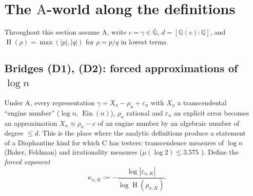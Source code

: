 \documentclass[11pt,a4paper]{article}
\newcommand{\Q}{\mathbb Q}
\newcommand{\Qbar}{\overline{\mathbb Q}}
\newcommand{\Ein}{\operatorname{Ein}}
\DeclareMathOperator{\Ht}{H}
\theoremstyle{definition}
\theoremstyle{remark}
\numberwithin{equation}{section}
\begin{document}
\section{The $\mathrm A$-world along the definitions}\label{III:sec:Aworld}

Throughout this section assume $\mathrm A$, write $c=\gamma\in\Qbar$, $d=[\Q(c):\Q]$,
and $\Ht(\rho)=\max(|p|,|q|)$ for $\rho=p/q$ in lowest terms.

\subsection{Bridges (D1), (D2): forced approximations of $\log n$}

Under $\mathrm A$, every representation $\gamma=X_n-\rho_n+\varepsilon_n$ with $X_n$ a
transcendental ``engine number'' ($\log n$, $\Ein(n)$), $\rho_n$ rational and
$\varepsilon_n$ an explicit error becomes an approximation $X_n\approx\rho_n-c$ of an
engine number by an algebraic number of degree $\le d$. This is the place where the
analytic definitions produce a statement of a Diophantine kind for which $\mathrm C$ has
testers: transcendence measures of $\log n$ (Baker, Feldman) and irrationality
measures ($\mu(\log2)\le3.575$ \cite{Marcovecchio}). Define the \emph{forced exponent}
\[
 \kappa_{n,K}:=-\frac{\log|\varepsilon_{n,K}|}{\log\Ht(\rho_{n,K})} .
\]
\end{document}

